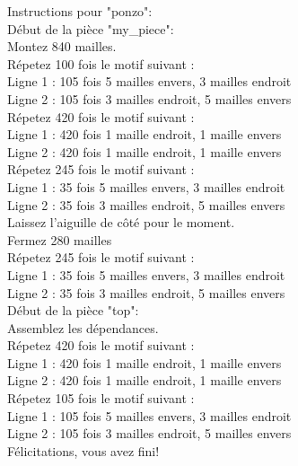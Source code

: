 \documentclass{article}
\begin{document}
\setlength{\parindent}{0cm}

Instructions pour "ponzo":\\

Début de la pièce "my\_piece":\\
Montez 840 mailles.\\

Répetez 100 fois le motif suivant :\\
Ligne 1 : 105 fois 5 mailles envers, 3 mailles endroit\\
Ligne 2 : 105 fois 3 mailles endroit, 5 mailles envers\\


Répetez 420 fois le motif suivant :\\
Ligne 1 : 420 fois 1 maille endroit, 1 maille envers\\
Ligne 2 : 420 fois 1 maille endroit, 1 maille envers\\


Répetez 245 fois le motif suivant :\\
Ligne 1 : 35 fois 5 mailles envers, 3 mailles endroit\\
Ligne 2 : 35 fois 3 mailles endroit, 5 mailles envers\\

Laissez l'aiguille de côté pour le moment.\\
Fermez 280 mailles\\

Répetez 245 fois le motif suivant :\\
Ligne 1 : 35 fois 5 mailles envers, 3 mailles endroit\\
Ligne 2 : 35 fois 3 mailles endroit, 5 mailles envers\\


Début de la pièce "top":\\
Assemblez les dépendances.\\

Répetez 420 fois le motif suivant :\\
Ligne 1 : 420 fois 1 maille endroit, 1 maille envers\\
Ligne 2 : 420 fois 1 maille endroit, 1 maille envers\\


Répetez 105 fois le motif suivant :\\
Ligne 1 : 105 fois 5 mailles envers, 3 mailles endroit\\
Ligne 2 : 105 fois 3 mailles endroit, 5 mailles envers\\


Félicitations, vous avez fini!
\end{document}
